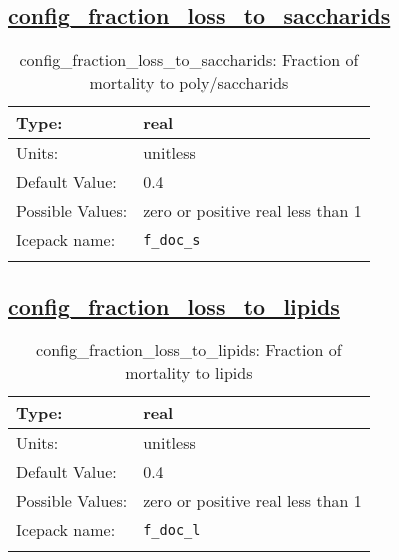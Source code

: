 \subsection[config\_fraction\_loss\_to\_saccharids]{\hyperref[sec:nm_tab_biogeochemistry]{config\_fraction\_loss\_to\_saccharids}}
\label{subsec:nm_sec_config_fraction_loss_to_saccharids}
\begin{center}
\begin{longtable}{| p{2.0in} || p{4.0in} |}
    \hline
    Type: & real \\
    \hline
    Units: & \si{unitless} \\
    \hline
    Default Value: & 0.4 \\
    \hline
    Possible Values: & zero or positive real less than 1 \\
    \hline
    Icepack name: & \verb+f_doc_s+ \\
    \hline
    \caption{config\_fraction\_loss\_to\_saccharids: Fraction of mortality to poly/saccharids}
\end{longtable}
\end{center}
\subsection[config\_fraction\_loss\_to\_lipids]{\hyperref[sec:nm_tab_biogeochemistry]{config\_fraction\_loss\_to\_lipids}}
\label{subsec:nm_sec_config_fraction_loss_to_lipids}
\begin{center}
\begin{longtable}{| p{2.0in} || p{4.0in} |}
    \hline
    Type: & real \\
    \hline
    Units: & \si{unitless} \\
    \hline
    Default Value: & 0.4 \\
    \hline
    Possible Values: & zero or positive real less than 1 \\
    \hline
    Icepack name: & \verb+f_doc_l+ \\
    \hline
    \caption{config\_fraction\_loss\_to\_lipids: Fraction of mortality to lipids}
\end{longtable}
\end{center}
